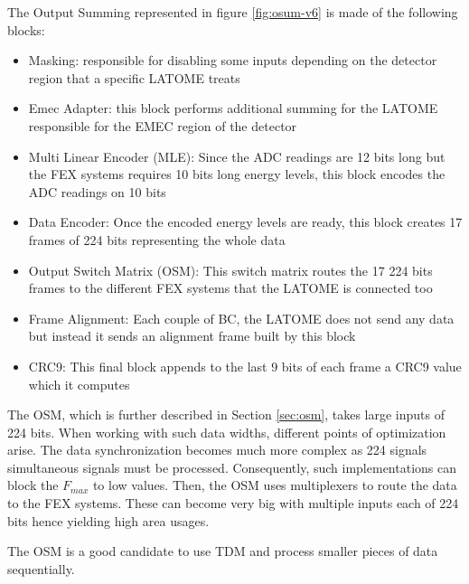 The Output Summing represented in figure \ref{fig:osum-v6} is made of the following blocks:
\begin{itemize}
    \item Masking: responsible for disabling some inputs depending on the detector region that a specific LATOME treats
    \item Emec Adapter: this block performs additional summing for the LATOME responsible for the EMEC region of the detector
    \item Multi Linear Encoder (MLE): Since the ADC readings are 12 bits long but the FEX systems requires 10 bits long energy levels, this block encodes the ADC readings on 10 bits
    \item Data Encoder: Once the encoded energy levels are ready, this block creates 17 frames of 224 bits representing the whole data
    \item Output Switch Matrix (OSM): This switch matrix routes the 17 224 bits frames to the different FEX systems that the LATOME is connected too
    \item Frame Alignment: Each couple of BC, the LATOME does not send any data but instead it sends an alignment frame built by this block
    \item CRC9: This final block appends to the last 9 bits of each frame a CRC9 value which it computes
\end{itemize}

The OSM, which is further described in Section \ref{sec:osm}, takes large inputs of 224 bits. When working with such data widths, different points of optimization arise. The data synchronization becomes much more complex as 224 signals simultaneous signals must be processed. Consequently, such implementations can block the \(F_{max}\) to low values. 
Then, the OSM uses multiplexers to route the data to the FEX systems. These can become very big with multiple inputs each of 224 bits hence yielding high area usages.

The OSM is a good candidate to use TDM and process smaller pieces of data sequentially.
